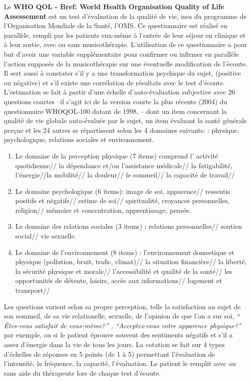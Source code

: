        Le\textbf{ WHO QOL  - Bref:  World Health
   Organisation Quality of Life Assessement } est un test d'évaluation de la qualité de vie, issu du
	programme de l'Organisation Mondiale de la Santé, l'OMS.
	Ce questionnaire est réalisé en parallèle, rempli par
        les patients eux-même à l'entrée de leur séjour en clinique et
        à leur sortie, avec ou sans musicothérapie.
 L'utilisation de ce questionnaire a pour but d'avoir
 une variable supplémentaire pour confirmer ou infirmer en
parallèle l'action supposée  de la musicothérapie sur une éventuelle
modification de l'écoute. Il sert aussi à constater s'il y a une transformation psychique du sujet,
 (positive ou négative) et s'il existe une corrélation de
 résultats avec le test d'écoute.
        L'estimation se fait à partir d'une échelle
d'auto-évaluation subjective avec 26 questions courtes 
--il s'agit ici de la version courte  la plus récente (2004) du questionnaire
 WHOQOL-100 datant de 1998, --
dont un item concernant la qualité de vie globale
auto-évaluée par le sujet, un item évaluant la santé générale perçue
et les 24 autres se répartissent selon les 4 domaines suivants:  
: physique, psychologique, relations sociales et environnement.
\begin{enumerate}
\item  Le domaine de la perception physique (7 items) comprend l' activité quotidienne// la dépendance et/ou l'assistance médicale// la fatigabilité, l'énergie//la mobilité// la douleur// le sommeil// la capacité de travail//
	\item Le domaine psychologique (6 items):  image de soi, apparence// ressentis positifs et négatifs// estime de soi// spiritualité, croyances personnelles, religion// mémoire et concentration, apprentissage, pensée.
		\item Le domaine des relations sociales (3 items) : relations personnelles// soutien social// vie sexuelle.
			\item Le domaine de l'environnement (8 items) :
                         l'environnement domestique et physique
                         (pollution, bruit, trafic, climat)// la
                         situation financière//  la liberté, la
                         sécurité physique et morale//
                         l'accessibilité et qualité de la santé// les
                         opportunités de détente, loisirs, accès aux
                         informations// logement et transport// 
\end{enumerate}
		Les questions varient selon sa propre perception, telle la satisfaction
au sujet de son  sommeil, de sa vie relationelle, sexuelle, de
l'opinion de que l'on a sur soi,  \textit{`` Êtes-vous satisfait de
vous-même?'' , ``Acceptez-vous votre apparence physique?''} par
exemple, ou si le patient éprouve souvent des sentiments négatifs
et s'il a assez d'énergie dans la vie de tous les jours.
La cotation se fait sur 4 types d'échelles de réponses en 5 points (de 1 à 5)
permettant l'évaluation de l'intensité, la fréquence, la capacité, l'évaluation.
Le patient le remplit avec ou sans aide du
thérapeute lors de chaque test
d'écoute.

